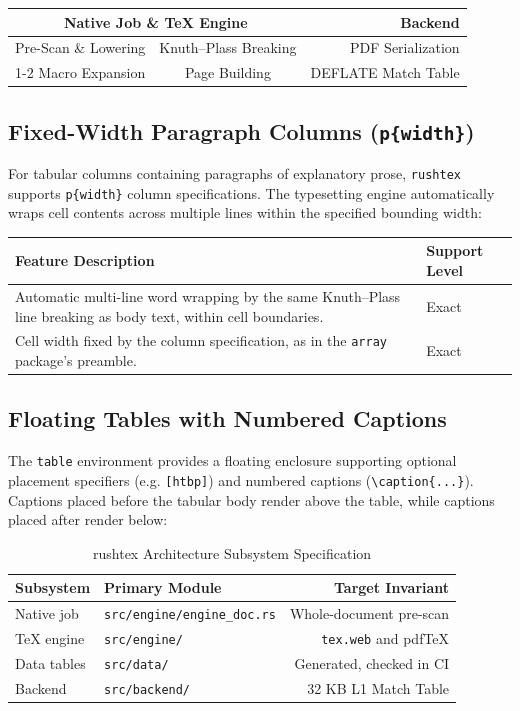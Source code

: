 \documentclass[11pt, a4paper]{article}
\begin{document}
\medskip

\begin{tabular}{|l|c|r|}
\hline
\multicolumn{2}{|c|}{\textbf{Native Job \& TeX Engine}} & \textbf{Backend} \\
\hline
Pre-Scan \& Lowering & Knuth--Plass Breaking & PDF Serialization \\
\cline{1-2}
Macro Expansion & Page Building & DEFLATE Match Table \\
\hline
\end{tabular}

\medskip

\subsection{Fixed-Width Paragraph Columns (\texttt{p\{width\}})}
For tabular columns containing paragraphs of explanatory prose, \texttt{rushtex} supports \texttt{p\{width\}} column specifications. The typesetting engine automatically wraps cell contents across multiple lines within the specified bounding width:

\medskip

\begin{tabular}{|p{5.5cm}|l|}
\hline
\textbf{Feature Description} & \textbf{Support Level} \\
\hline
Automatic multi-line word wrapping by the same Knuth--Plass line breaking as body text, within cell boundaries. & Exact \\
\hline
Cell width fixed by the column specification, as in the \texttt{array} package's preamble. & Exact \\
\hline
\end{tabular}

\medskip

\subsection{Floating Tables with Numbered Captions}
The \texttt{table} environment provides a floating enclosure supporting optional placement specifiers (e.g. \texttt{[htbp]}) and numbered captions (\verb|\caption{...}|). Captions placed before the tabular body render above the table, while captions placed after render below:

\begin{table}[htbp]
\caption{rushtex Architecture Subsystem Specification}
\begin{tabular}{|l|l|r|}
\hline
\textbf{Subsystem} & \textbf{Primary Module} & \textbf{Target Invariant} \\
\hline
Native job & \texttt{src/engine/engine\_doc.rs} & Whole-document pre-scan \\
TeX engine & \texttt{src/engine/} & \texttt{tex.web} and pdfTeX \\
Data tables & \texttt{src/data/} & Generated, checked in CI \\
Backend & \texttt{src/backend/} & 32 KB L1 Match Table \\
\hline
\end{tabular}
\end{table}
\end{document}
